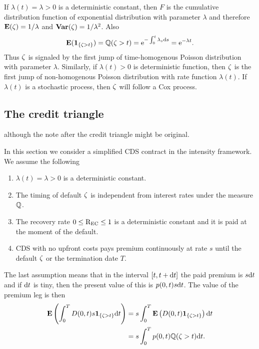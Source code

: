 If $\lambda (t) = \lambda > 0$ is a deterministic constant, then $F$ is the cumulative distribution function of exponential distribution with parameter $\lambda$ and therefore $\operatorname{\boldsymbol{\mathrm{E}}} (\zeta) = 1/\lambda$ and $\operatorname{\boldsymbol{\mathrm{Var}}} (\zeta) = 1/\lambda^2$. Also
  \begin{align}
    \label{survivalexpectationforconstanthazard}
    \operatorname{\boldsymbol{\mathrm{E}}} ( \boldsymbol{1}_{ \{ \zeta > t \} } ) = \mathbb{Q} ( \zeta > t ) = \mathrm{e}^{-\int_0^t \lambda_s \mathrm{d} s} = \mathrm{e}^{-\lambda t} .
  \end{align}
Thus $\zeta$ is signaled by the first jump of time-homogenous Poisson distribution with parameter $\lambda$. Similarly, if $\lambda (t) > 0$ is deterministic function, then $\zeta$ is the first jump of non-homogenous Poisson distribution with rate function $\lambda(t)$. If $\lambda (t)$ is a stochastic process, then $\zeta$ will follow a Cox process.

\subsection{The credit triangle}

 \textcite[pp. 54--55]{o2011modelling} although the note after the credit triangle might be original.

In this section we consider a simplified CDS contract in the intensity framework. We assume the following

\begin{enumerate}[labelindent=\parindent, leftmargin=*]
	\item $\lambda (t) = \lambda > 0$ is a deterministic constant.
	\item The timing of default $\zeta$ is independent from interest rates under the measure $\mathbb{Q}$.
	\item The recovery rate $0 \leq \mathrm{R_{EC}} \leq 1$ is a deterministic constant and it is paid at the moment of the default.
	\item CDS with no upfront costs pays premium continuously at rate $s$ until the default $\zeta$ or the termination date $T$.
\end{enumerate}

The last assumption means that in the interval $[t,t+ \mathrm{d} t]$ the paid premium is $s \mathrm{d} t$ and if $\mathrm{d} t$ is tiny, then the present value of this is $p(0,t) s \mathrm{d} t$. The value of the premium leg is then
\begin{align}
\label{trianglevaluationpremium}
\operatorname{\boldsymbol{\mathrm{E}}} \left( \int_0^T D(0,t) s \boldsymbol{1}_{\{ \zeta > t \}} \mathrm{d} t  \right) &= s \int_0^T \operatorname{\boldsymbol{\mathrm{E}}} \left( D(0,t) \boldsymbol{1}_{\{ \zeta > t \}} \right) \mathrm{d} t \\
&= s \int_0^T  p(0,t) \mathbb{Q} ( \zeta > t ) \mathrm{d} t .
\end{align}

